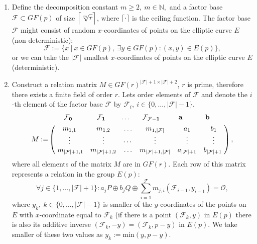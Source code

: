 \documentclass[thesis=M,english]{FITthesis}[2012/10/20]
\theoremstyle{remark}
\theoremstyle{definition}
\begin{document}
\begin{enumerate}
\item Define the decomposition constant $m \geq 2,\ m \in \mathbb{N},$ and a factor base $\mathcal{F} \subset GF(p)$ of size $\mathlarger{\Big\lceil \sqrt[m]{r} \Big\rceil}$, where $\lceil \cdot \rceil$ is the ceiling function. The factor base $\mathcal{F}$ might consist of random $x$-coordinates of points on the elliptic curve $E$ (non-deterministic):
$$
\mathcal{F} := \Big\{x\ \Big|\ x \in GF(p),\ \exists y \in GF(p): (x,y) \in E(p)  \Big\},
$$
or we can take the $|\mathcal{F}|$ smallest $x$-coordinates of points on the elliptic curve $E$ (deterministic).
\item Construct a relation matrix $M \in GF(r)^{|\mathcal{F}| + 1 \times |\mathcal{F}| + 2}$, $r$ is prime, therefore there exists a finite field of order $r$. Lets order elements of $\mathcal{F}$ and denote the $i$-th element of the factor base $\mathcal{F}$ by $\mathcal{F}_i,\ i \in \{0,\ldots,|\mathcal{F}| - 1\}.$
\begin{align*}
&\begin{matrix}
\hphantom{........}\mathbf{\mathcal{F}_0} & \hphantom{.........} \mathbf{\mathcal{F}_1} & \hphantom{....}\ldots &\hphantom{...} \mathbf{\mathcal{F}_{\mathcal{F} - 1}} & \hphantom{......}\mathbf{a} & \hphantom{........} \mathbf{b}
\end{matrix}\\
M := &\begin{pmatrix}
m_{1,1} & m_{1,2} & \ldots & m_{1,|\mathcal{F}|} & a_1 & b_1 \\
\vdots & \vdots & \cdots & \vdots & \vdots  & \vdots  \\
\hphantom{.}m_{|\mathcal{F}| + 1,1} & m_{|\mathcal{F}| + 1,2} & \ldots & m_{|\mathcal{F}| + 1,|\mathcal{F}|} & a_{|\mathcal{F}| + 1} & b_{|\mathcal{F}| + 1} \hphantom{.}
\end{pmatrix},
\end{align*}
where all elements of the matrix $M$ are in $GF(r)$. Each row of this matrix represents a relation in the group $E(p)$:
$$
\forall j \in \{1,\ldots,|\mathcal{F}| + 1\}: a_jP \oplus b_jQ \oplus \sum_{i=1}^{\mathcal{F}} m_{j,i} (\mathcal{F}_{i-1}, y_{i-1}) = \mathcal{O}, 
$$
where $y_k,\ k \in \{0,\ldots,|\mathcal{F}| - 1\}$ is smaller of the $y$-coordinates of the points on $E$ with $x$-coordinate equal to $\mathcal{F}_k$ (if there is a point $(\mathcal{F}_k, y)$ in $E(p)$ there is also its additive inverse $(\mathcal{F}_k,-y) = (\mathcal{F}_k, p - y)$ in $E(p)$. We take smaller of these two values as $y_k := \text{min}(y, p - y)$.  \\ \\

\end{enumerate}
\end{document}
